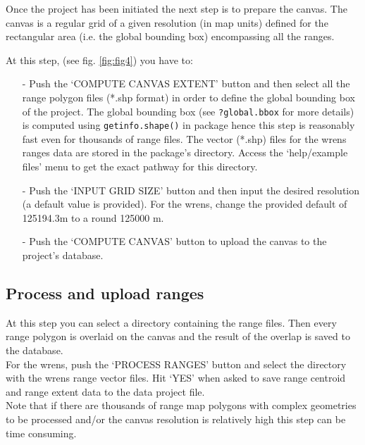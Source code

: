 \documentclass[ a4paper ]{article}
\begin{document}
	Once the project has been initiated the next step is to prepare the canvas. 
	The canvas is a regular grid of a given resolution (in map units) defined for the rectangular area (i.e. the global bounding box) encompassing all the ranges. 
	
	At this step, (see fig. \ref{fig:fig4}) you have to:
	
	\begin{enumerate}
		 \item[-] Push the `COMPUTE CANVAS EXTENT' button and then select all the range polygon files (*.shp format) in order to define the global bounding box of the project. The global bounding box (see \texttt{?global.bbox} for more details) is computed using \texttt{getinfo.shape()} in \cite{maptools} package hence this step is reasonably fast even for thousands of range files. The vector (*.shp) files for the wrens ranges data are stored in the package's directory.  Access the `help/example files' menu to get the exact pathway for this directory.
		 \item[-] Push the `INPUT GRID SIZE' button and then input the desired resolution (a default value is provided). For the wrens, change the provided default of 125194.3m to a round 125000 m.
		 \item[-] Push the `COMPUTE CANVAS' button to upload the canvas to the project's database.
	\end{enumerate}
	

	\subsection{Process and upload ranges}

	At this step you can select a directory containing the range files. Then every range polygon is overlaid on the canvas and the result of the overlap is saved to the database.\\
For the wrens, push the `PROCESS RANGES' button and select the directory with the wrens range vector files. Hit `YES' when asked to save range centroid and range extent data to the data project file.\\
Note that if there are thousands of range map polygons with complex geometries to be processed and/or the canvas resolution is relatively high this step can be time consuming. 
	
\end{document}
